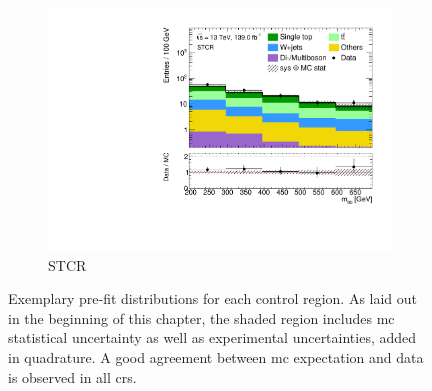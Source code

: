 \begin{figure}
\begin{subfigure}[b]{0.5\linewidth}
		\centering\includegraphics[width=1.0\textwidth]{1Lbb_STCR_mbb}
		\caption{STCR\label{fig:signal_contaminations_STCR}}
	\end{subfigure}\hfill

	\caption{Exemplary pre-fit distributions for each control region. As laid out in the beginning of this chapter, the shaded region includes \gls{mc} statistical uncertainty as well as experimental uncertainties, added in quadrature. A good agreement between \gls{mc} expectation and data is observed in all \glspl{cr}.}
	\label{fig:CR_distributions_prefit}
\end{figure}

